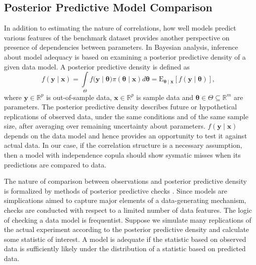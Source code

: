 \documentclass[12pt]{report}
\begin{document}
\subsection{Posterior Predictive Model Comparison}

In addition to estimating the nature of correlations, how well models predict various features of the benchmark dataset provides another perspective on presence of dependencies between parameters. In Bayesian analysis, inference about model adequacy is based on examining a posterior predictive density of a given data model.
A posterior predictive density is defined as
%
\begin{equation}
f(\boldsymbol{y} \mid \boldsymbol{x}) = \int\limits_{\Theta} f(\boldsymbol{y} \mid \boldsymbol{\theta)}\pi(\boldsymbol{\theta} \mid \boldsymbol{x})d\boldsymbol{\theta} = \operatorname{E_{\boldsymbol{\theta} \mid \boldsymbol{x}}}[f(\boldsymbol{y} \mid \boldsymbol{\theta})],
\end{equation}
%
where $\boldsymbol{y} \in \mathbb{R}^p$ is out-of-sample data,
$\boldsymbol{x} \in \mathbb{R}^p$ is sample data and
$\boldsymbol{\theta} \in \Theta \subseteq \mathbb{R}^m$ are parameters. The posterior predictive
density describes future or hypothetical replications of observed data, under the same conditions and of the same sample size, after averaging over remaining uncertainty about parameters. $f(\boldsymbol{y} \mid \boldsymbol{x})$ depends on the data model and hence provides an opportunity to test it against actual data. In our case, if the correlation structure is a necessary assumption, then a model with independence copula should show sysmatic misses when its predictions are compared to data.

The nature of comparison between observations and posterior predictive
density is formalized by methods of posterior predictive
checks \citep{GelGoe2000,GelCar2013}. Since models are simplications aimed to capture major elements of a data-generating mechanism, checks are conducted with respect to a limited number of data features. The logic of checking a data model is frequentist. Suppose we simulate many replications of the actual experiment according to the posterior predictive density and calculate some statistic of interest. A model is adequate if the statistic based on observed data is sufficiently likely under the distribution of a statistic based on predicted data. 
\end{document}
